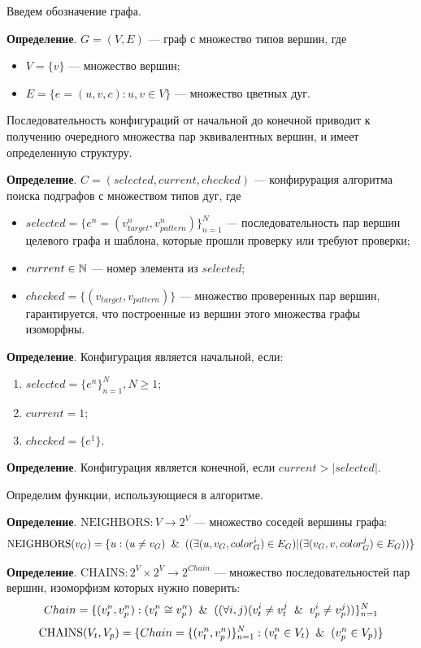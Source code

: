 Введем обозначение графа.

\textbf{Определение}. $G = ( V, E )$ --- граф с множество типов вершин, где
\begin{itemize}
\item $V = \{ v \}$ --- множество вершин;
\item $E = \{ e = (u, v, c) :  u, v \in V \}$ --- множество цветных дуг.
\end{itemize}

Последовательность конфигураций от начальной до конечной приводит к получению
очередного множества пар эквивалентных вершин, и имеет определенную структуру.

\textbf{Определение}. $C = ( selected, current, checked )$ --- конфирурация
алгоритма поиска подграфов с множеством типов дуг, где
\begin{itemize}
\item $selected = \{ e^n = ( v^n_{target}, v^n_{pattern} ) \}_{n=1}^N$ ---
последовательность пар вершин целевого графа и шаблона, которые прошли проверку
или требуют проверки;
\item $current \in \mathbb{N}$ --- номер элемента из $selected$;
\item $checked = \{ ( v_{target}, v_{pattern} ) \}$ --- множество проверенных
пар вершин, гарантируется, что построенные из вершин этого множества графы
изоморфны.
\end{itemize}

\textbf{Определение}. Конфигурация является начальной, если:
\begin{enumerate}
\item $selected = \{ e^n \}_{n=1}^N, N \ge 1$;
\item $current = 1$;
\item $checked = \{ e^1 \}$.
\end{enumerate}

\textbf{Определение}. Конфигурация является конечной, если $current > |selected|$.

Определим функции, использующиеся в алгоритме.

\textbf{Определение}. $\textrm{NEIGHBORS} : V \to 2^V$ --- множество соседей вершины графа:
%
$$\textrm{NEIGHBORS}(v_G) = \{ u : (u \ne v_G) \And ( ( \exists (u, v_G, color^i_G) \in E_G ) | ( \exists (v_G, v, color^j_G) \in E_G ) ) \}$$

\textbf{Определение}. $\textrm{CHAINS} : 2^V \times 2^V \to 2^{Chain}$ --- множество последовательностей пар вершин, изоморфизм которых нужно поверить:
%
$$Chain = \{ ( v^n_t, v^n_p ) : ( v^n_t \cong v^n_p ) \And ( ( \forall i, j ) ( v^i_t \ne v^j_t \And v^i_p \ne v^j_p ) ) \}_{n = 1}^N$$
%
$$\textrm{CHAINS}(V_t, V_p) = \{ Chain = \{ ( v^n_t, v^n_p ) \}_{n = 1}^N : ( v^n_t \in V_t ) \And ( v^n_p \in V_p ) \}$$

